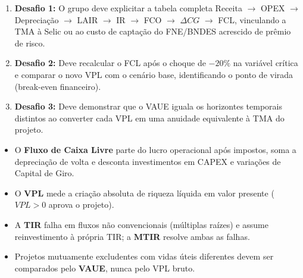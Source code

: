 \begin{boxGabarito}
\begin{enumerate}[leftmargin=1.5em, itemsep=3pt]
  \item \textbf{Desafio 1:} O grupo deve explicitar a tabela completa Receita $\to$ OPEX $\to$ Depreciação $\to$ LAIR $\to$ IR $\to$ FCO $\to$ $\Delta CG$ $\to$ FCL, vinculando a TMA à Selic ou ao custo de captação do FNE/BNDES acrescido de prêmio de risco.
  \item \textbf{Desafio 2:} Deve recalcular o FCL após o choque de $-20\%$ na variável crítica e comparar o novo VPL com o cenário base, identificando o ponto de virada (break-even financeiro).
  \item \textbf{Desafio 3:} Deve demonstrar que o VAUE iguala os horizontes temporais distintos ao converter cada VPL em uma anuidade equivalente à TMA do projeto.
\end{enumerate}
\end{boxGabarito}

\begin{boxResumo}
\begin{itemize}[leftmargin=1.4em, itemsep=2pt]
  \item O \textbf{Fluxo de Caixa Livre} parte do lucro operacional após impostos, soma a depreciação de volta e desconta investimentos em CAPEX e variações de Capital de Giro.
  \item O \textbf{VPL} mede a criação absoluta de riqueza líquida em valor presente ($VPL > 0$ aprova o projeto).
  \item A \textbf{TIR} falha em fluxos não convencionais (múltiplas raízes) e assume reinvestimento à própria TIR; a \textbf{MTIR} resolve ambas as falhas.
  \item Projetos mutuamente excludentes com vidas úteis diferentes devem ser comparados pelo \textbf{VAUE}, nunca pelo VPL bruto.
\end{itemize}
\end{boxResumo}

